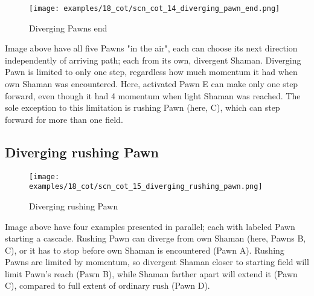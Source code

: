 \clearpage %

\vspace*{-2.1\baselineskip}
\noindent
\begin{figure}[!h]
\texttt{[image: examples/18\_cot/scn\_cot\_14\_diverging\_pawn\_end.png]}
\vspace*{-1.3\baselineskip}
\caption{Diverging Pawns end}
\label{fig:scn_cot_14_diverging_pawn_end}
\end{figure}

\vspace*{-0.4\baselineskip}
Image above have all five Pawns "in the air", each can choose its next direction
independently of arriving path; each from its own, divergent Shaman. \newline
\indent
Diverging Pawn is limited to only one step, regardless how much momentum it had
when own Shaman was encountered. Here, activated Pawn E can make only one step
forward, even though it had 4 momentum when light Shaman was reached. The sole
exception to this limitation is rushing Pawn (here, C), which can step forward
for more than one field.

\clearpage %

\subsection*{Diverging rushing Pawn}
\label{sec:Conquest of Tlalocan/Divergence/Diverging rushing Pawn}

\vspace*{-1.4\baselineskip}
\noindent
\begin{figure}[!h]
\texttt{[image: examples/18\_cot/scn\_cot\_15\_diverging\_rushing\_pawn.png]}
\vspace*{-1.3\baselineskip}
\caption{Diverging rushing Pawn}
\label{fig:scn_cot_15_diverging_rushing_pawn}
\end{figure}

\vspace*{-0.5\baselineskip}
Image above have four examples presented in parallel; each with labeled Pawn starting
a cascade. \newline
\indent
Rushing Pawn can diverge from own Shaman (here, Pawns B, C), or it has to stop before
own Shaman is encountered (Pawn A). Rushing Pawns are limited by momentum, so
divergent Shaman closer to starting field will limit Pawn's reach (Pawn B), while
Shaman farther apart will extend it (Pawn C), compared to full extent of ordinary
rush (Pawn D).

